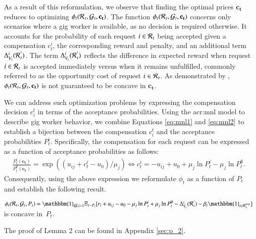 As a result of this reformulation, we observe that finding the optimal prices $\mathbf{c_t}$ reduces to optimizing $\phi_t(\mathcal{R}\hspace{0.05em}_{t},\mathcal{G}_t,\mathbf{c_t})$. The function $\phi_t(\mathcal{R}\hspace{0.05em}_{t},\mathcal{G}_t,\mathbf{c_t})$ concerns only scenarios where a gig worker is available, as no decision is required otherwise. It accounts for the probability of each request $i \in \mathcal{R}\hspace{0.05em}_{t}$ being accepted given a compensation $c_t^i$, the corresponding reward and penalty, and an additional term $\Delta^i_{V_{t}}(\mathcal{R}\hspace{0.05em}_t^{'})$. The term $\Delta^i_{V_{t}}(\mathcal{R}\hspace{0.05em}_t^{'})$ reflects the difference in expected reward when request $i \in \mathcal{R}\hspace{0.05em}_{t}$ is accepted immediately versus when it remains unfulfilled, commonly referred to as the opportunity cost of request $i \in \mathcal{R}\hspace{0.05em}_{t}$. As demonstrated by \cite{hanson1996optimizing}, $\phi_t(\mathcal{R}\hspace{0.05em}_{t},\mathcal{G}_t,\mathbf{c_t})$ is not guaranteed to be concave in $\mathbf{c_t}$. 

We can address such optimization problems by expressing the compensation decision $c^t_i$ in terms of the acceptance probabilities. Using the \gls{acr:mnl} model to describe gig worker behavior, we combine Equations \eqref{eq:mnl1} and \eqref{eq:mnl2} to establish a bijection between the compensation \(c^t_i\) and the acceptance probabilities \(P_t^i\). Specifically, the compensation for each request can be expressed as a function of acceptance probabilities as follows:
\begin{align}
\frac{P_t^i(\mathbf{c_t})}{P_t^{\emptyset}(\mathbf{c_t})} = \exp((u_{ij} + c_t^i - u_0)/\mu_j) \Leftrightarrow c_t^i = -u_{ij} + u_0 + \mu_j \ln{P_t^i} - \mu_j \ln{P_t^{\emptyset}}.
\label{eq:mnl3}
\end{align}
Consequently, using the above expression we reformulate $\phi_t$ as a function of $P_t$ and establish the following result.
\begin{lemma}\label{lem:concavity}
$\phi_t(\mathcal{R}\hspace{0.05em}_{t},\mathcal{G}_t,P_t) = \mathbbm{1}_{|\mathcal{G}_t|=1}\mathbb{E}_{i \sim P_t}[r_i + u_{ij} - u_0 - \mu_j \ln{P_t^i} + \mu_j \ln{P_t^{\emptyset}}  - \Delta^i_{V_{t}}(\mathcal{R}\hspace{0.05em}_t^{'}) -\beta_i\mathbbm{1}_{i \in \mathcal{R}\hspace{0.05em}_t^{\mathrm{exp}}}]$ is concave in~$P_t$.
\end{lemma}
The proof of Lemma 2 can be found in Appendix \ref{sec:p_2}. 

